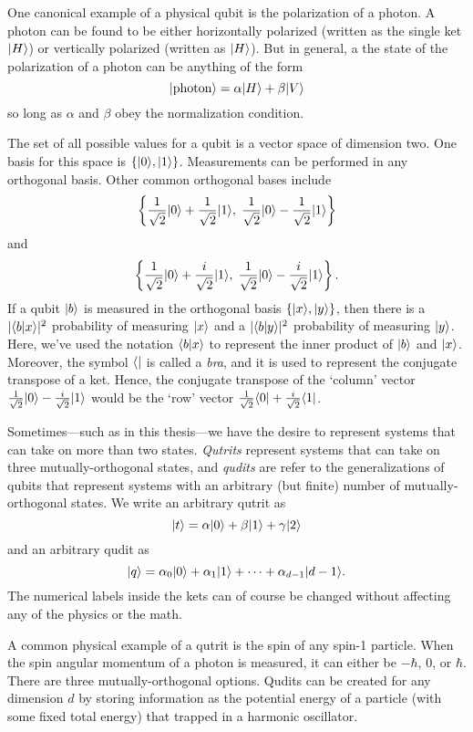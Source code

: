 One canonical example of a physical qubit is the polarization of a photon. A photon can be found to be either horizontally polarized (written as the single ket $| H \rangle$) or vertically polarized (written as $| H \rangle$). But in general, a the state of the polarization of a photon can be anything of the form
\[
| \text{photon} \rangle = \alpha | H \rangle + \beta | V \rangle
\] so long as $\alpha$ and $\beta$ obey the normalization condition.


The set of all possible values for a qubit is a vector space of dimension two. One basis for this space is $\{| 0 \rangle, | 1 \rangle\}$. Measurements can be performed in any orthogonal basis. Other common orthogonal bases include
\[
\left\{\frac{1}{\sqrt{2}}| 0 \rangle + \frac{1}{\sqrt{2}}| 1 \rangle, \; \frac{1}{\sqrt{2}}| 0 \rangle -\frac{1}{\sqrt{2}} | 1 \rangle\right\}
\] and
\[
\left\{\frac{1}{\sqrt{2}}| 0 \rangle + \frac{i}{\sqrt{2}}| 1 \rangle, \; \frac{1}{\sqrt{2}}| 0 \rangle -\frac{i}{\sqrt{2}} | 1 \rangle\right\}.
\] If a qubit $| b \rangle$ is measured in the orthogonal basis $\{| x \rangle, | y \rangle\}$, then there is a $|\langle b | x \rangle|^2$ probability of measuring $| x \rangle$ and a $|\langle b | y \rangle|^2$ probability of measuring $| y \rangle$.   Here, we've used the notation $\langle b | x \rangle$ to represent the inner product of $| b \rangle$ and $| x \rangle$. Moreover, the symbol $\langle  |$ is called a \textit{bra}, and it is used to represent the conjugate transpose of a ket.  Hence, the conjugate transpose of the `column' vector $\frac{1}{\sqrt{2}}| 0 \rangle -\frac{i}{\sqrt{2}} | 1 \rangle$ would be the `row' vector $\frac{1}{\sqrt{2}}\langle 0 | + \frac{i}{\sqrt{2}} \langle 1 |$. 



Sometimes---such as in this thesis---we have the desire to represent systems that can take on more than two states. \textit{Qutrits} represent systems that can take on three mutually-orthogonal states, and \textit{qudits} are refer to the generalizations of qubits that represent systems with an arbitrary (but finite) number of mutually-orthogonal states. We write an arbitrary qutrit as 
\[
| t \rangle = \alpha | 0 \rangle + \beta | 1 \rangle + \gamma | 2 \rangle
\]
and an arbitrary qudit as
\[
| q \rangle = \alpha_0 | 0 \rangle + \alpha_1 | 1 \rangle + \cdots + \alpha_{d-1} | d-1 \rangle.
\] The numerical labels inside the kets can of course be changed without affecting any of the physics or the math.

A common physical example of a qutrit is the spin of any spin-1 particle. When the spin angular momentum of a photon is measured, it can either be $-\hbar$, $0$, or $\hbar$. There are three mutually-orthogonal options. Qudits can be created for any dimension $d$ by storing information as the potential energy of a particle (with some fixed total energy) that trapped in a harmonic oscillator.


